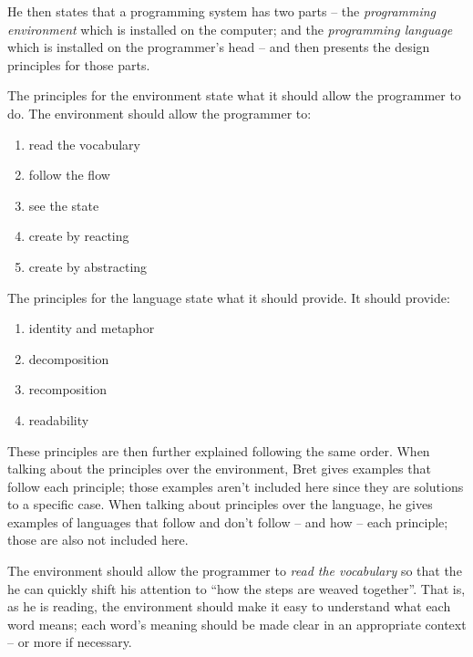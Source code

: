 \documentclass{./llncs2e/llncs}
\begin{document}
He then states that a programming system has two parts -- the \emph{programming environment} which is installed on the computer; and the \emph{programming language} which is installed on the programmer's head -- and then presents the design principles for those parts.

The principles for the environment state what it should allow the programmer to do. The environment should allow the programmer to:
\begin{enumerate}
	\item \label{lp:env:read} read the vocabulary 
	\item \label{lp:env:flow} follow the flow
	\item \label{lp:env:state} see the state
	\item \label{lp:env:react} create by reacting
	\item \label{lp:env:abstr} create by abstracting
\end{enumerate}

The principles for the language state what it should provide. It should provide:
\begin{enumerate}
	\item \label{lp:lang:id} identity and metaphor
	\item \label{lp:lang:decom} decomposition
	\item \label{lp:lang:recom} recomposition
	\item \label{lp:lang:read} readability
\end{enumerate}

These principles are then further explained following the same order. When talking about the principles over the environment, Bret gives examples that follow each principle; those examples aren't included here since they are solutions to a specific case. When talking about principles over the language, he gives examples of languages that follow and don't follow -- and how -- each principle; those are also not included here.

The environment should allow the programmer to \emph{read the vocabulary} so that the he can quickly shift his attention to ``how the steps are weaved together''. That is, as he is reading, the environment should make it easy to understand what each word means; each word's meaning should be made clear in an appropriate context -- or more if necessary.
\end{document}
